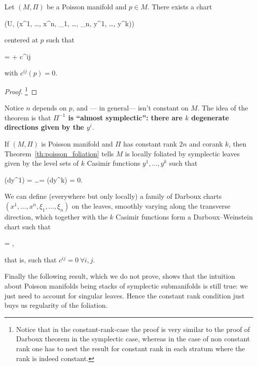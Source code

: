 \documentclass[main.tex]{subfiles}
\begin{document}
\begin{theorem}
\label{th:darboux_weinstein}
	Let $(M, \Pi)$ be a Poisson manifold and $p \in M$. There exists a chart
	\begin{eqalign}
		(U, (x^1, \ldots, x^n, \xi_1, \ldots, \xi_n, y^1, \ldots, y^k))
	\end{eqalign}
	centered at $p$ such that
	\begin{eqalign}
		\Pi =  \wedge {} +  c^{ij}  \wedge \pder{}{y^j}
	\end{eqalign}
	with $c^{ij}(p) = 0$.
\end{theorem}
\begin{proof}
	\cite[Theorem 3.13]{fernandes2014lectures} \footnote{Notice that in the constant-rank-case the proof is very similar to the proof of Darboux theorem in the symplectic case, whereas in the case of non constant rank one has to nest the result for constant rank in each stratum where the rank is indeed constant.}
\end{proof}

Notice $n$ depends on $p$, and --- in general--- isn't constant on $M$. The idea of the theorem is that \textbf{$\Pi^{-1}$ is ``almost symplectic'': there are $k$ degenerate directions given by the $y^i$}.

\begin{remark}
	If $(M, \Pi)$ is Poisson manifold and $\Pi$ has constant rank $2n$ and corank $k$, then Theorem~\ref{th:poisson_foliation} tells $M$ is locally foliated by symplectic leaves given by the level sets of $k$ Casimir functions $y^1, \ldots, y^k$ such that
	\begin{eqalign}
		\Pi(dy^1) = \ldots = \Pi(dy^k) = 0.
	\end{eqalign}
	We can define (everywhere but only locally) a family of Darboux charts $(x^1, \ldots, x^n, \xi_1, \ldots, \xi_n)$ on the leaves, smoothly varying along the transverse direction, which together with the $k$ Casimir functions form a Darboux--Weinstein chart such that
	\begin{eqalign}
		\Pi =  \wedge \pder{}{\xi_i},
	\end{eqalign}
	that is, such that $c^{ij} = 0\ \forall i,j$.
\end{remark}

Finally the following result, which we do not prove, shows that the intuition about Poisson manifolds being stacks of symplectic submanifolds is still true: we just need to account for singular leaves. Hence the constant rank condition just buys us regularity of the foliation.
\end{document}
